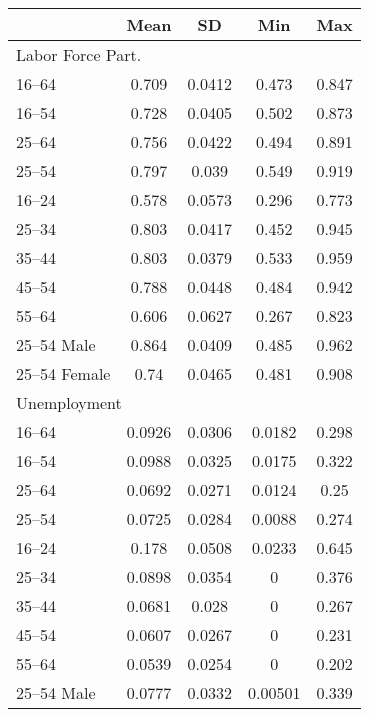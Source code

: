{
\def\sym#1{\ifmmode^{#1}\else\(^{#1}\)\fi}
\begin{tabular}{l*{1}{cccc}}
\hline\hline
            &        Mean&          SD&         Min&         Max\\
\hline\hline
\multicolumn{5}{l}{Labor Force Part.}\\
\hline\hline
16--64     &       0.709&      0.0412&       0.473&       0.847\\
16--54     &       0.728&      0.0405&       0.502&       0.873\\
25--64     &       0.756&      0.0422&       0.494&       0.891\\
25--54     &       0.797&       0.039&       0.549&       0.919\\
\hline
16--24     &       0.578&      0.0573&       0.296&       0.773\\
25--34     &       0.803&      0.0417&       0.452&       0.945\\
35--44     &       0.803&      0.0379&       0.533&       0.959\\
45--54     &       0.788&      0.0448&       0.484&       0.942\\
55--64     &       0.606&      0.0627&       0.267&       0.823\\
\hline
25--54 Male  &       0.864&      0.0409&       0.485&       0.962\\
25--54 Female  &        0.74&      0.0465&       0.481&       0.908\\
\hline\hline
\multicolumn{5}{l}{Unemployment}\\
\hline\hline
16--64   &      0.0926&      0.0306&      0.0182&       0.298\\
16--54   &      0.0988&      0.0325&      0.0175&       0.322\\
25--64   &      0.0692&      0.0271&      0.0124&        0.25\\
25--54   &      0.0725&      0.0284&      0.0088&       0.274\\
\hline
16--24   &       0.178&      0.0508&      0.0233&       0.645\\
25--34   &      0.0898&      0.0354&           0&       0.376\\
35--44   &      0.0681&       0.028&           0&       0.267\\
45--54   &      0.0607&      0.0267&           0&       0.231\\
55--64   &      0.0539&      0.0254&           0&       0.202\\
\hline
25--54 Male &      0.0777&      0.0332&     0.00501&       0.339\\

\end{tabular}}

